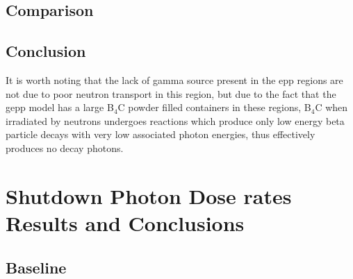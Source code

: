 \documentclass[12pt]{article}
\begin{document}
\clearpage
\subsection{Comparison}



\subsection{Conclusion}

It is worth noting that the lack of gamma source present in the \gls{epp}
regions are not due to poor neutron transport in this region, but due to the
fact that the \gls{gepp} model has a large B$_4$C powder filled containers
in these regions, B$_4$C when irradiated by neutrons undergoes reactions
which produce only low energy beta particle decays with very low associated
photon energies, thus effectively produces no decay photons.

\newpage
\clearpage
\section{Shutdown Photon Dose rates Results and Conclusions}


\subsection{Baseline}
\end{document}
